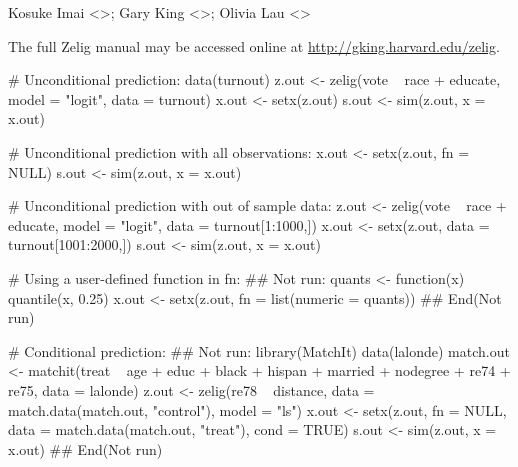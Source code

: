 \begin{Author}\relax
Kosuke Imai <>; Gary King
<>; Olivia Lau <>
\end{Author}
\begin{SeeAlso}\relax
The full Zelig manual may be accessed online at
\url{http://gking.harvard.edu/zelig}.
\end{SeeAlso}
\begin{Examples}
\begin{ExampleCode}
# Unconditional prediction:
data(turnout)
z.out <- zelig(vote ~ race + educate, model = "logit", data = turnout)
x.out <- setx(z.out)
s.out <- sim(z.out, x = x.out)

# Unconditional prediction with all observations:
x.out <- setx(z.out, fn = NULL)
s.out <- sim(z.out, x = x.out)

# Unconditional prediction with out of sample data:
z.out <- zelig(vote ~ race + educate, model = "logit",
               data = turnout[1:1000,])
x.out <- setx(z.out, data = turnout[1001:2000,])
s.out <- sim(z.out, x = x.out)

# Using a user-defined function in fn:
## Not run: 
quants <- function(x)
  quantile(x, 0.25)
x.out <- setx(z.out, fn = list(numeric = quants))
## End(Not run)

# Conditional prediction:  
## Not run: 
library(MatchIt)
data(lalonde)
match.out <- matchit(treat ~ age + educ + black + hispan + married + 
                     nodegree + re74 + re75, data = lalonde)
z.out <- zelig(re78 ~ distance, data = match.data(match.out, "control"), 
               model = "ls")
x.out <- setx(z.out, fn = NULL, data = match.data(match.out, "treat"),
              cond = TRUE)
s.out <- sim(z.out, x = x.out)
## End(Not run)
\end{ExampleCode}
\end{Examples}


